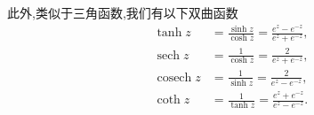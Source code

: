 此外,类似于三角函数,我们有以下双曲函数
\begin{equation}
    \begin{aligned}
    \tanh z & =\frac{\sinh z}{\cosh z}=\frac{e^z-e^{-z}}{e^z+e^{-z}}, \\
    \operatorname{sech} z & =\frac{1}{\cosh z}=\frac{2}{e^z+e^{-z}}, \\
    \operatorname{cosech} z & =\frac{1}{\sinh z}=\frac{2}{e^z-e^{-z}}, \\
    \coth z & =\frac{1}{\tanh z}=\frac{e^z+e^{-z}}{e^z-e^{-z}} . 
    \end{aligned}
\end{equation}



%     

